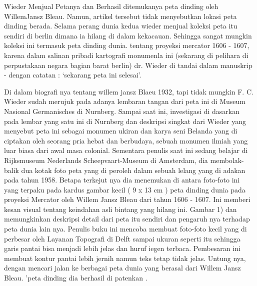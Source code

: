  
Wieder Menjual Petanya dan Berhasil ditemukanya peta dinding oleh WillemJansz Bleau. Namun, artikel tersebut tidak menyebutkan lokasi peta dinding berada. 
Selama perang dunia kedua wieder menjual koleksi peta itu sendiri di berlin dimana ia hilang di dalam kekacauan. 
Sehingga sangat mungkin koleksi ini termasuk peta dinding dunia. tentang proyeksi mercator 1606 - 1607, 
karena dalam salinan pribadi kartografi monumenla ini (sekarang di pelihara di perpustakaan negara bagian barat berlin) 
dr. Wieder di tandai dalam manuskrip - dengan catatan : `sekarang peta ini selesai'. 


Di dalam biografi nya tentang willem jansz Blaeu 1932, tapi tidak mungkin F. C. Wieder sudah merujuk pada adanya lembaran tangan dari 
peta ini di Museum Nasional Germanisches di Nurnberg. Sampai saat ini, investigasi di dasarkan pada lembar yang satu ini di Nurnberg dan deskripsi singkat dari Wieder yang menyebut peta ini sebagai monumen ukiran 
dan karya seni Belanda yang di ciptakan oleh seorang pria hebat dan berbudaya, sebuah monumen ilmiah yang luar biasa dari awal masa colonial. 
Sementara penulis saat ini sedang belajar di Rijksmuseum Nederlands Scheepvaart-Museum di Amsterdam, 
dia membolak-balik dua kotak foto peta yang di peroleh dalam sebuah lelang yang di adakan pada tahun 1958. 
Betapa terkejut nya dia menemukan di antara foto-foto ini yang terpaku pada kardus gambar kecil ( 9 x 13 cm ) 
peta dinding dunia pada proyeksi Mercator oleh Willem Jansz Bleau dari tahun 1606 - 1607. 
Ini memberi kesan visual tentang keindahan asli bintang yang hilang ini. 
Gambar 1) dan memungkinkan deskripsi detail dari peta itu sendiri dan pengaruh nya terhadap peta dunia lain nya. 
Penulis buku ini mencoba membuat foto-foto kecil yang di perbesar oleh Layanan Topografi di Delft sampai ukuran seperti itu 
sehingga garis pantai bisa menjadi lebih jelas dan huruf iegen terbaca. 
Pembesaran ini membuat kontur pantai lebih jernih namun teks tetap tidak jelas. 
Untung nya, dengan mencari jalan ke berbagai peta dunia yang berasal dari Willem Jansz Bleau. 'peta dinding dia berhasil di patenkan \cite{campbell1976descriptive}.

